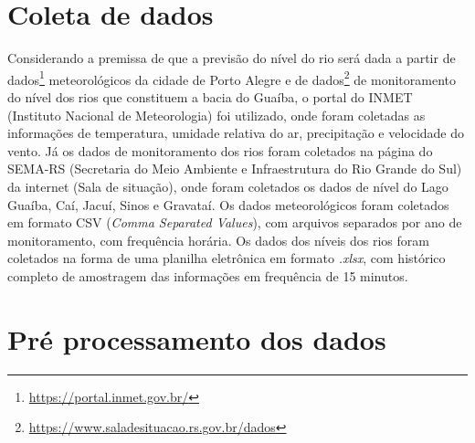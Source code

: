 


\section{Coleta de dados}
\label{sec:coleta_dados}

Considerando a premissa de que a previsão do nível do rio será dada a partir de dados\footnote{\url{https://portal.inmet.gov.br/}} meteorológicos da cidade de Porto Alegre e de dados\footnote{\url{https://www.saladesituacao.rs.gov.br/dados}} de monitoramento do nível dos rios que constituem a bacia do Guaíba, o portal do \gls{INMET} (Instituto Nacional de Meteorologia) foi utilizado, onde foram coletadas as informações de temperatura, umidade relativa do ar, precipitação e velocidade do vento. Já os dados de monitoramento dos rios foram coletados na página do \gls{SEMA-RS} (Secretaria do Meio Ambiente e Infraestrutura do Rio Grande do Sul) da internet (Sala de situação), onde foram coletados os dados de nível do Lago Guaíba, Caí, Jacuí, Sinos e Gravataí. Os dados meteorológicos foram coletados em formato \gls{CSV} (\textit{Comma Separated Values}), com arquivos separados por ano de monitoramento, com frequência horária. Os dados dos níveis dos rios foram coletados na forma de uma planilha eletrônica em formato \textit{.xlsx}, com histórico completo de amostragem das informações em frequência de 15 minutos.

\section{Pré processamento dos dados}
\label{sec:pre_processamento_dos_dados}

